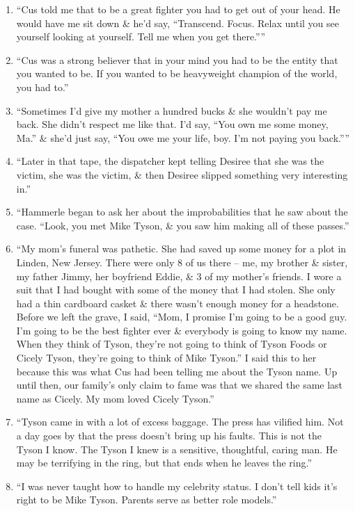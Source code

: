\documentclass{article}
\numberwithin{equation}{section}
\begin{document}
\begin{enumerate}
	\item ``Cus told me that to be a great fighter you had to get out of your head. He would have me sit down \& he'd say, ``Transcend. Focus. Relax until you see yourself looking at yourself. Tell me when you get there.''''
	\item ``Cus was a strong believer that in your mind you had to be the entity that you wanted to be. If you wanted to be heavyweight champion of the world, you had to.''
	\item ``Sometimes I'd give my mother a hundred bucks \& she wouldn't pay me back. She didn't respect me like that. I'd say, ``You own me some money, Ma.'' \& she'd just say, ``You owe me your life, boy. I'm not paying you back.''''
	\item ``Later in that tape, the dispatcher kept telling Desiree that she was the victim, she was the victim, \& then Desiree slipped something very interesting in.''
	\item ``Hammerle began to ask her about the improbabilities that he saw about the case. ``Look, you met Mike Tyson, \& you saw him making all of these passes.''
	\item ``My mom's funeral was pathetic. She had saved up some money for a plot in Linden, New Jersey. There were only 8 of us there -- me, my brother \& sister, my father Jimmy, her boyfriend Eddie, \& 3 of my mother's friends. I wore a suit that I had bought with some of the money that I had stolen. She only had a thin cardboard casket \& there wasn't enough money for a headstone. Before we left the grave, I said, ``Mom, I promise I'm going to be a good guy. I'm going to be the best fighter ever \& everybody is going to know my name. When they think of Tyson, they're not going to think of Tyson Foods or Cicely Tyson, they're going to think of Mike Tyson.'' I said this to her because this was what Cus had been telling me about the Tyson name. Up until then, our family's only claim to fame was that we shared the same last name as Cicely. My mom loved Cicely Tyson.''
	\item ``Tyson came in with a lot of excess baggage. The press has vilified him. Not a day goes by that the press doesn't bring up his faults. This is not the Tyson I know. The Tyson I knew is a sensitive, thoughtful, caring man. He may be terrifying in the ring, but that ends when he leaves the ring.''
	\item ``I was never taught how to handle my celebrity status. I don't tell kids it's right to be Mike Tyson. Parents serve as better role models.''

\end{enumerate}
\end{document}
